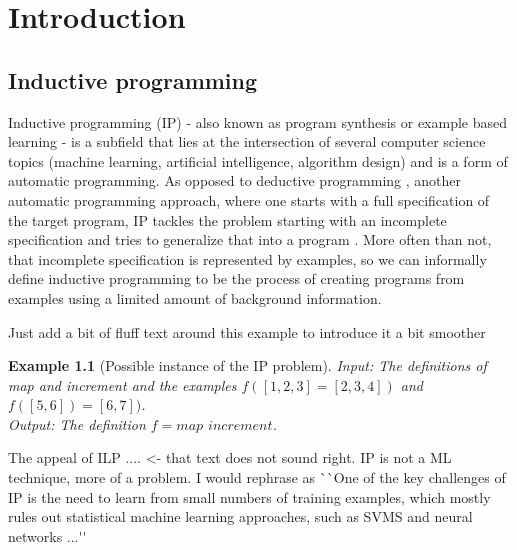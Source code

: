   {\topsep}{\topsep}%
  {}{}%
  {\bfseries}{}%
  {\newline}{}%
\theoremstyle{indented}
\newtheorem{exam}{Example}

\chapter{Introduction}

\section{Inductive programming}
\indent
\indent Inductive programming (IP) - also known as program synthesis or example based learning - is a subfield that lies at the intersection of several computer science topics (machine learning, artificial intelligence, algorithm design) and is a form of automatic programming. As opposed to deductive programming \cite{deductive}, another automatic programming approach, where one starts with a full specification of the target program, IP tackles the problem starting with an incomplete specification and tries to generalize that into a program \cite{cropperth}. More often than not, that incomplete specification is represented by examples, so we can informally define inductive programming to be the process of creating programs from examples using a limited amount of background information.

\ac{Just add a bit of fluff text around this example to introduce it a bit smoother}
\begin{exam}[Possible instance of the IP problem]
\textit{Input}: The definitions of \textit{map} and \textit{increment} and the examples $f([1,2,3] = [2,3,4])$ and $f([5,6]) = [6,7])$.
\\
\textit{Output}: The definition $f = map$ $increment$. %
\end{exam}

\ac{The appeal of ILP .... <- that text does not sound right. IP is not a ML technique, more of a problem.
I would rephrase as ``One of the key challenges of IP is the need to learn from small numbers of training examples, which mostly rules out statistical machine learning approaches, such as SVMS and neural networks ...''}

